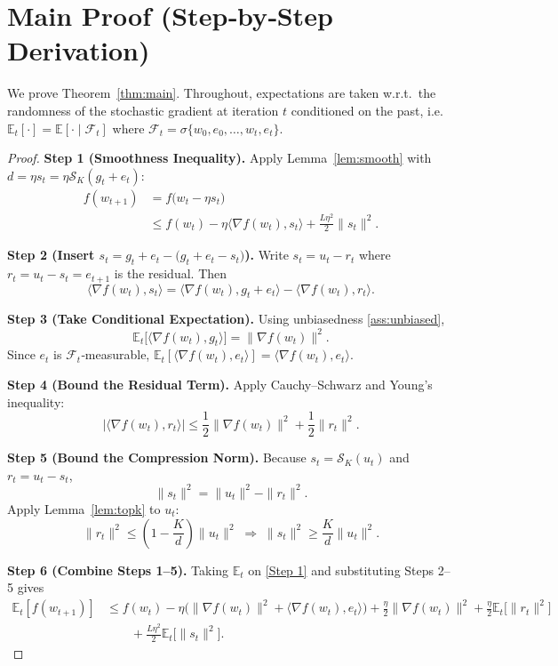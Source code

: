\documentclass[11pt]{article}
\begin{document}
\section*{Main Proof (Step‑by‑Step Derivation)}
We prove Theorem~\ref{thm:main}. Throughout, expectations are taken w.r.t.\ the randomness of the stochastic gradient at iteration $t$ conditioned on the past, i.e. $\mathbb{E}_{t}[\cdot]=\mathbb{E}[\cdot\mid \mathcal{F}_{t}]$ where $\mathcal{F}_{t}=\sigma\{w_{0},e_{0},\dots,w_{t},e_{t}\}$.

\begin{proof}
\textbf{Step 1 (Smoothness Inequality).}  
Apply Lemma~\ref{lem:smooth} with $d=\eta s_{t}=\eta\mathcal{S}_{K}(g_{t}+e_{t})$:
\begin{align}
f(w_{t+1})
&=f\!\big(w_{t}-\eta s_{t}\big) \nonumber\\
&\le f(w_{t})-\eta\langle\nabla f(w_{t}),s_{t}\rangle+\frac{L\eta^{2}}{2}\|s_{t}\|^{2}. \tag{Step 1}
\end{align}

\textbf{Step 2 (Insert $s_{t}=g_{t}+e_{t}-\big(g_{t}+e_{t}-s_{t}\big)$).}  
Write $s_{t}=u_{t}-r_{t}$ where $r_{t}=u_{t}-s_{t}=e_{t+1}$ is the residual. Then
\[
\langle\nabla f(w_{t}),s_{t}\rangle
= \langle\nabla f(w_{t}),g_{t}+e_{t}\rangle-\langle\nabla f(w_{t}),r_{t}\rangle.
\tag{Step 2}
\]

\textbf{Step 3 (Take Conditional Expectation).}  
Using unbiasedness \eqref{ass:unbiased},
\[
\mathbb{E}_{t}\big[\langle\nabla f(w_{t}),g_{t}\rangle\big]=\|\nabla f(w_{t})\|^{2}.
\tag{Step 3}
\]
Since $e_{t}$ is $\mathcal{F}_{t}$‑measurable, $\mathbb{E}_{t}[\langle\nabla f(w_{t}),e_{t}\rangle]=\langle\nabla f(w_{t}),e_{t}\rangle$.

\textbf{Step 4 (Bound the Residual Term).}  
Apply Cauchy–Schwarz and Young’s inequality:
\[
\big|\langle\nabla f(w_{t}),r_{t}\rangle\big|
\le \frac{1}{2}\|\nabla f(w_{t})\|^{2}+\frac{1}{2}\|r_{t}\|^{2}.
\tag{Step 4}
\]

\textbf{Step 5 (Bound the Compression Norm).}  
Because $s_{t}=\mathcal{S}_{K}(u_{t})$ and $r_{t}=u_{t}-s_{t}$,
\[
\|s_{t}\|^{2} = \|u_{t}\|^{2}-\|r_{t}\|^{2}.
\]
Apply Lemma~\ref{lem:topk} to $u_{t}$:
\[
\|r_{t}\|^{2}\le\left(1-\frac{K}{d}\right)\|u_{t}\|^{2}
\;\Longrightarrow\;
\|s_{t}\|^{2}\ge\frac{K}{d}\|u_{t}\|^{2}.
\tag{Step 5}
\]

\textbf{Step 6 (Combine Steps 1–5).}  
Taking $\mathbb{E}_{t}$ on \eqref{Step 1} and substituting Steps 2–5 gives
\begin{align}
\mathbb{E}_{t}[f(w_{t+1})]
&\le f(w_{t})-\eta\Big(\|\nabla f(w_{t})\|^{2}
+\langle\nabla f(w_{t}),e_{t}\rangle\Big)
+\frac{\eta}{2}\|\nabla f(w_{t})\|^{2}
+\frac{\eta}{2}\mathbb{E}_{t}\!\big[\|r_{t}\|^{2}\big] \nonumber\\
&\qquad +\frac{L\eta^{2}}{2}\mathbb{E}_{t}\!\big[\|s_{t}\|^{2}\big].
\tag{Step 6}
\end{align}


\end{proof}
\end{document}
